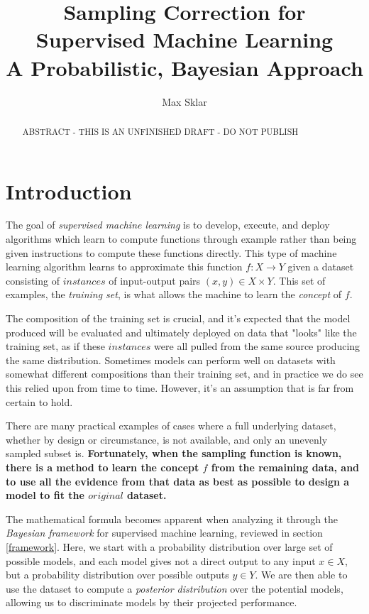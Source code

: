 \documentclass[twoside]{article}
\begin{document}
\parindent=0in
\parskip=12pt

\title{
  Sampling Correction for Supervised Machine Learning \\
  \large{
    A  Probabilistic, Bayesian Approach
  }
}

\author{Max Sklar}

\maketitle
\thispagestyle{empty}

\begin{abstract}
ABSTRACT - THIS IS AN UNFINISHED DRAFT - DO  NOT PUBLISH
\end{abstract}

\section{Introduction}
\label{section:introduction}

The goal of \textit{supervised machine learning} is to develop, execute, and deploy algorithms which learn to compute functions through example rather than being given instructions to compute these functions directly. This type of machine learning algorithm learns to approximate this function \(f: X \to Y\) given a dataset consisting of \(instances\) of input-output pairs \((x, y) \in X \times Y\). This set of examples, the \textit{training set}, is what allows the machine to learn the \textit{concept} of \(f\).

The composition of the training set is crucial, and it's expected that the model produced will be evaluated and ultimately deployed on data that "looks" like the training set, as if these \(instances\) were all pulled from the same source producing the same distribution. Sometimes models can perform well on datasets with somewhat different compositions than their training set, and in practice we do see this relied upon from time to time. However, it's an assumption that is far from certain to hold.

There are many practical examples of cases where a full underlying dataset, whether by design or circumstance, is not available, and only an unevenly sampled subset is. \textbf{Fortunately, when the sampling function is known, there is a method to learn the concept \(f\) from the remaining data, and to use all the evidence from that data as best as possible to design a model to fit the \(original\) dataset.} 

The mathematical formula becomes apparent when analyzing it through the \textit{Bayesian framework} for supervised machine learning, reviewed in section \ref{framework}. Here, we start with a probability distribution over large set of possible models, and each model gives not a direct output to any input \(x \in X\), but a probability distribution over possible outputs \(y \in Y\). We are then able to use the dataset to compute a \textit{posterior distribution} over the potential models, allowing us to discriminate models by their projected performance.
\end{document}
